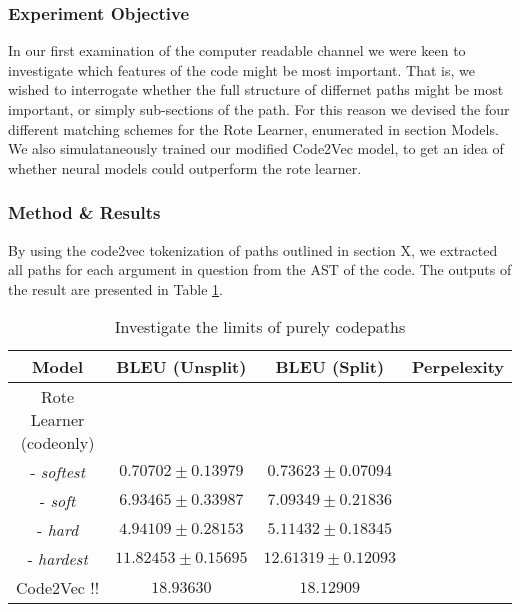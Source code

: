 \subsubsection{Experiment Objective} %

In our first examination of the computer readable channel we were keen to investigate which features of the code might be most important.
That is, we wished to interrogate whether the full structure of differnet paths might be most important, or simply sub-sections of the path. 
For this reason we devised the four different matching schemes for the Rote Learner, enumerated in section Models.
We also simulataneously trained our modified Code2Vec model, to get an idea of whether neural models could outperform the rote learner.


\subsubsection{Method \& Results} %

By using the code2vec tokenization of paths outlined in section X, we extracted all paths for each argument in question from the AST of the code. 
The outputs of the result are presented in Table \ref{table:name_code2vec_solo}.




\begin{table}[ht!]
\begin{center}
\begin{tabular}{ c | c | c | c }
    Model                             & BLEU (Unsplit)  & BLEU (Split)    & Perpelexity \\
    \hline
    Rote Learner (codeonly)           &  & & \\
    - \textit{softest}                     & $ 0.70702 \pm  0.13979 $ & $ 0.73623 \pm 0.07094 $ &  \\
    - \textit{soft}                        & $ 6.93465 \pm  0.33987 $ & $ 7.09349 \pm 0.21836 $ & \\
    - \textit{hard}                        & $ 4.94109 \pm  0.28153 $ & $ 5.11432 \pm 0.18345 $ & \\
    - \textit{hardest}                     & $ 11.82453 \pm  0.15695 $ & $ 12.61319 \pm 0.12093 $ & \\
    \hline
    Code2Vec   !!                            & $ 18.93630 $ & $ 18.12909 $ & \\
    \hline
\end{tabular}
\caption {Investigate the limits of purely codepaths}
\label{table:name_code2vec_solo}
\end{center}
\end{table}

